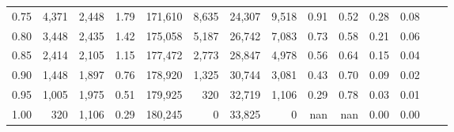 \begin{tabular}{rrrrrrrrrrrrrr}
0.75 &   4,371 &  2,448 &    1.79 &  171,610 &    8,635 &  24,307 &   9,518 &  0.91 &  0.52 &  0.28 &      0.08 \\
0.80 &   3,448 &  2,435 &    1.42 &  175,058 &    5,187 &  26,742 &   7,083 &  0.73 &  0.58 &  0.21 &      0.06 \\
0.85 &   2,414 &  2,105 &    1.15 &  177,472 &    2,773 &  28,847 &   4,978 &  0.56 &  0.64 &  0.15 &      0.04 \\
0.90 &   1,448 &  1,897 &    0.76 &  178,920 &    1,325 &  30,744 &   3,081 &  0.43 &  0.70 &  0.09 &      0.02 \\
0.95 &   1,005 &  1,975 &    0.51 &  179,925 &      320 &  32,719 &   1,106 &  0.29 &  0.78 &  0.03 &      0.01 \\
1.00 &     320 &  1,106 &    0.29 &  180,245 &        0 &  33,825 &       0 &   nan &   nan &  0.00 &      0.00 \\
\bottomrule
\end{tabular}
